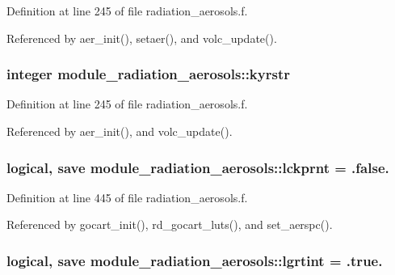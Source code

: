 Definition at line 245 of file radiation\+\_\+aerosols.\+f.



Referenced by aer\+\_\+init(), setaer(), and volc\+\_\+update().

\subsubsection[{\texorpdfstring{kyrstr}{kyrstr}}]{\setlength{\rightskip}{0pt plus 5cm}integer module\+\_\+radiation\+\_\+aerosols\+::kyrstr\hspace{0.3cm}{\ttfamily [private]}}\hypertarget{namespacemodule__radiation__aerosols_af224f7d7991e3d48aeaa4d221da50f41}{}\label{namespacemodule__radiation__aerosols_af224f7d7991e3d48aeaa4d221da50f41}


Definition at line 245 of file radiation\+\_\+aerosols.\+f.



Referenced by aer\+\_\+init(), and volc\+\_\+update().

\subsubsection[{\texorpdfstring{lckprnt}{lckprnt}}]{\setlength{\rightskip}{0pt plus 5cm}logical, save module\+\_\+radiation\+\_\+aerosols\+::lckprnt = .false.\hspace{0.3cm}{\ttfamily [private]}}\hypertarget{namespacemodule__radiation__aerosols_a018d5414597049069c1ddd1094285371}{}\label{namespacemodule__radiation__aerosols_a018d5414597049069c1ddd1094285371}


Definition at line 445 of file radiation\+\_\+aerosols.\+f.



Referenced by gocart\+\_\+init(), rd\+\_\+gocart\+\_\+luts(), and set\+\_\+aerspc().

\subsubsection[{\texorpdfstring{lgrtint}{lgrtint}}]{\setlength{\rightskip}{0pt plus 5cm}logical, save module\+\_\+radiation\+\_\+aerosols\+::lgrtint = .true.\hspace{0.3cm}{\ttfamily [private]}}\hypertarget{namespacemodule__radiation__aerosols_aa27bf6912bfd67b78381892d4f555c51}{}\label{namespacemodule__radiation__aerosols_aa27bf6912bfd67b78381892d4f555c51}


